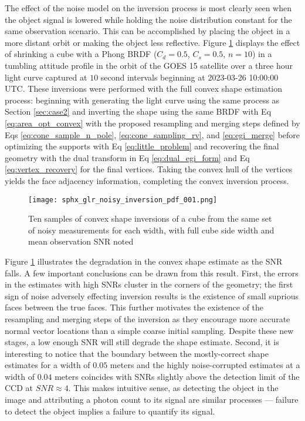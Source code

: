 The effect of the noise model on the inversion process is most clearly seen when the object signal is lowered while holding the noise distribution constant for the same observation scenario. This can be accomplished by placing the object in a more distant orbit or making the object less reflective. Figure \ref{fig:noisy_convex_inversions} displays the effect of shrinking a cube with a Phong BRDF ($C_d=0.5$, $C_s=0.5$, $n=10$) in a tumbling attitude profile in the orbit of the GOES 15 satellite over a three hour light curve captured at $10$ second intervals beginning at 2023-03-26 10:00:00 UTC. These inversions were performed with the full convex shape estimation process: beginning with generating the light curve using the same process as Section \ref{sec:case2} and inverting the shape using the same BRDF with Eq \ref{eq:area_opt_convex} with the proposed resampling and merging steps defined by Eqs \ref{eq:cone_sample_n_pole}, \ref{eq:cone_sampling_rv}, and \ref{eq:egi_merge} before optimizing the supports with Eq \ref{eq:little_problem} and recovering the final geometry with the dual transform in Eq \ref{eq:dual_egi_form} and Eq \ref{eq:vertex_recovery} for the final vertices. Taking the convex hull of the vertices yields the face adjacency information, completing the convex inversion process.

\begin{figure}[!htb]
  \centering
  \texttt{[image: sphx\_glr\_noisy\_inversion\_pdf\_001.png]}
  \caption{Ten samples of convex shape inversions of a cube from the same set of noisy measurements for each width, with full cube side width and mean observation SNR noted}
  \label{fig:noisy_convex_inversions}
\end{figure}

Figure \ref{fig:noisy_convex_inversions} illustrates the degradation in the convex shape estimate as the SNR falls. A few important conclusions can be drawn from this result. First, the errors in the estimates with high SNRs cluster in the corners of the geometry; the first sign of noise adversely effecting inversion results is the existence of small suprious faces between the true faces. This further motivates the existence of the resampling and merging steps of the inversion as they encourage more accurate normal vector locations than a simple coarse initial sampling. Despite these new stages, a low enough SNR will still degrade the shape estimate. Second, it is interesting to notice that the boundary between the mostly-correct shape estimates for a width of $0.05$ meters and the highly noise-corrupted estimates at a width of $0.04$ meters coincides with SNRs slightly above the detection limit of the CCD at $SNR\approx 4$. This makes intuitive sense, as detecting the object in the image and attributing a photon count to its signal are similar processes --- failure to detect the object implies a failure to quantify its signal.

